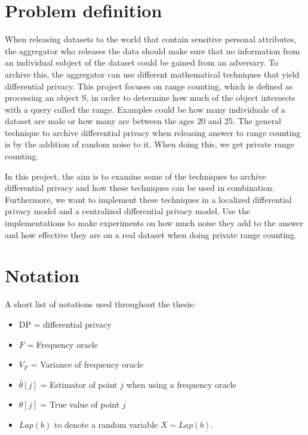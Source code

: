 \documentclass[11pt]{article}
\theoremstyle{definition}
\begin{document}


\section{Problem definition}
When releasing datasets to the world that contain sensitive personal attributes, the aggregator who releases the data should make sure that no information from an individual subject of the dataset could be gained from an adversary. To archive this, the aggregator can use different mathematical techniques that yield differential privacy.
This project focuses on range counting, which is defined as processing an object S, in order to determine how much of the object intersects with a query called the range. Examples could be how many individuals of a dataset are male or how many are between the ages 20 and 25. The general technique to archive differential privacy when releasing answer to range counting is by the addition of random noise to it. When doing this, we get private range counting.

In this project, the aim is to examine some of the techniques to archive differential privacy and how these techniques can be used in combination. Furthermore, we want to implement these techniques in a localized differential privacy model and a centralized differential privacy model. Use the implementations to make experiments on how much noise they add to the answer and how effective they are on a real dataset when doing private range counting.

\section{Notation}
A short list of notations used throughout the thesis:
\begin{itemize}
\item DP = differential privacy
\item $F$ = Frequency oracle
\item $V_{F}$ = Variance of frequency oracle
\item $\hat{\theta}[j]$ = Estimator of point $j$ when using a frequency oracle
\item $\theta[j]$ = True value of point $j$ 
\item $Lap(b)$ to denote a random variable $X\sim Lap(b)$.

\end{itemize}
\end{document}
